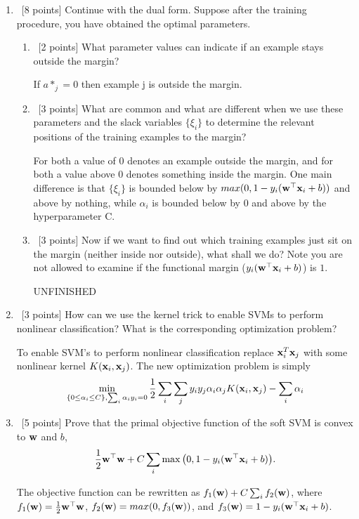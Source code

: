 \documentclass[12pt, fullpage,letterpaper]{article}
\begin{document}
\begin{enumerate}
	\item~[8 points] Continue with the dual form. Suppose after the training procedure, you have obtained the optimal parameters.
	\begin{enumerate}
		\item~[2 points] What parameter values can indicate if an example stays outside the margin?
		
		If $a*_j = 0$ then example j is outside the margin.
		
		\item~[3 points] What are common and what are different when we use these parameters and the slack variables $\{\xi_i\}$ to determine the relevant positions of the training examples to the margin?
		
		For both a value of 0 denotes an example outside the margin, and for both a value above 0 denotes something inside the margin. One main difference is that $\{\xi_i\}$ is bounded below by $max(0, 1 - y_i({\bf w}^\top {\bf x}_i + b))$ and above by nothing, while $\alpha_i$ is bounded below by 0 and above by the hyperparameter C.
		
		\item~[3 points] Now if we want to find out which training examples just sit on the margin (neither inside nor outside), what shall we do? Note you are not allowed to examine if the functional margin (\ie $y_i({\bf w}^\top{\bf x}_i +b)$) is $1$.
		
		UNFINISHED
	\end{enumerate}
	
	
	\item~[3 points] How can we use the kernel trick to enable SVMs to perform nonlinear classification? What is the corresponding optimization problem?
	
	To enable SVM's to perform nonlinear classification replace ${\bf x}_i^T{\bf x}_j$ with some nonlinear kernel $K({\bf x}_i, {\bf x}_j)$. The new optimization problem is simply \[
	\min\limits_{\{0 \le \alpha_i \le C\}, \sum_i \alpha_i y_i = 0} \frac{1}{2} \sum_i \sum_j y_i y_j \alpha_i \alpha_j K({\bf x}_i, {\bf x}_j) - \sum_{i} \alpha_i
	\]


	\item~[5 points] Prove that the primal objective function of the soft SVM is convex to ${\bf w}$ and $b$, 
	\[
	\frac{1}{2}{\bf w}^\top{\bf w} + C\sum_{i} \max\big(0, 1 - y_i({\bf w}^\top{\bf x}_i+b)\big).
	\]
	
	The objective function can be rewritten as $f_1({\bf w}) + C \sum_{i} f_2({\bf w})$, where $f_1({\bf w}) = \frac{1}{2}{\bf w}^\top{\bf w}$, $f_2({\bf w}) = max(0, f_3({\bf w}))$, and $f_3({\bf w}) = 1 - y_i({\bf w}^\top{\bf x}_i+b)$. 
	

\end{enumerate}
\end{document}
